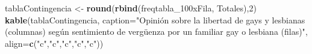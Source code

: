 \documentclass[
  12 pt,
  a4paper,
]{article}
\newenvironment{Shaded}{\begin{snugshade}}{\end{snugshade}}
\newcommand{\AttributeTok}[1]{\textcolor[rgb]{0.13,0.29,0.53}{#1}}
\newcommand{\DecValTok}[1]{\textcolor[rgb]{0.00,0.00,0.81}{#1}}
\newcommand{\FunctionTok}[1]{\textcolor[rgb]{0.13,0.29,0.53}{\textbf{#1}}}
\newcommand{\NormalTok}[1]{#1}
\newcommand{\OtherTok}[1]{\textcolor[rgb]{0.56,0.35,0.01}{#1}}
\newcommand{\StringTok}[1]{\textcolor[rgb]{0.31,0.60,0.02}{#1}}
\begin{document}
\begin{Shaded}
\begin{Highlighting}[]
\NormalTok{tablaContingencia }\OtherTok{\textless{}{-}} \FunctionTok{round}\NormalTok{(}\FunctionTok{rbind}\NormalTok{(freqtabla\_100xFila, Totales),}\DecValTok{2}\NormalTok{)}
\FunctionTok{kable}\NormalTok{(tablaContingencia, }
\AttributeTok{caption=}\StringTok{"Opinión sobre la libertad de gays y lesbianas (columnas)}
\StringTok{según sentimiento de vergüenza por un familiar gay o lesbiana (filas)"}\NormalTok{,}
\AttributeTok{align=}\FunctionTok{c}\NormalTok{(}\StringTok{"c"}\NormalTok{,}\StringTok{"c"}\NormalTok{,}\StringTok{"c"}\NormalTok{,}\StringTok{"c"}\NormalTok{,}\StringTok{"c"}\NormalTok{))}
\end{Highlighting}
\end{Shaded}
\end{document}
